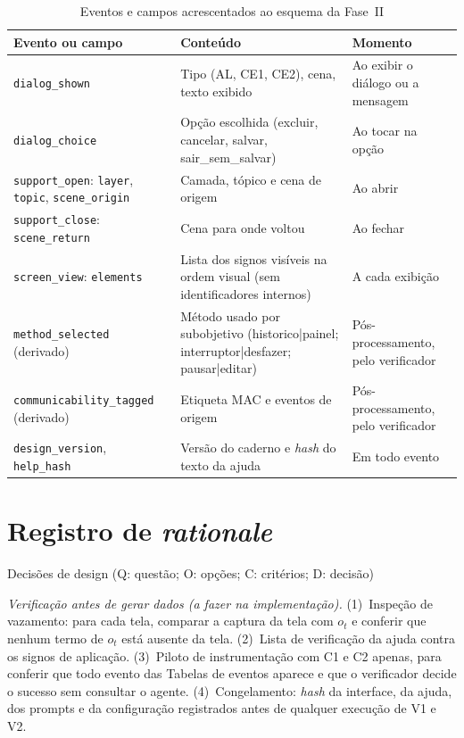 \documentclass[conference,onecolumn]{IEEEtran}
\newcommand{\ev}[1]{\texttt{#1}}
\begin{document}
\begin{table}[!h]
\caption{Eventos e campos acrescentados ao esquema da Fase~II}
\label{tab:eventos}
\centering
\footnotesize
\begin{tabularx}{\textwidth}{@{}P{3.4cm}YP{3.2cm}@{}}
\toprule
\textbf{Evento ou campo} & \textbf{Conteúdo} & \textbf{Momento} \\
\midrule
\ev{dialog\_shown} & Tipo (AL, CE1, CE2), cena, texto exibido & Ao exibir o diálogo ou a mensagem \\
\ev{dialog\_choice} & Opção escolhida (excluir, cancelar, salvar, sair\_sem\_salvar) & Ao tocar na opção \\
\ev{support\_open}: \texttt{layer}, \texttt{topic}, \texttt{scene\_origin} & Camada, tópico e cena de origem & Ao abrir \\
\ev{support\_close}: \texttt{scene\_return} & Cena para onde voltou & Ao fechar \\
\ev{screen\_view}: \texttt{elements} & Lista dos signos visíveis na ordem visual (sem identificadores internos) & A cada exibição \\
\ev{method\_selected} (derivado) & Método usado por subobjetivo (historico|painel; interruptor|desfazer; pausar|editar) & Pós-processamento, pelo verificador \\
\ev{communicability\_tagged} (derivado) & Etiqueta MAC e eventos de origem & Pós-processamento, pelo verificador \\
\texttt{design\_version}, \texttt{help\_hash} & Versão do caderno e \textit{hash} do texto da ajuda & Em todo evento \\
\bottomrule
\end{tabularx}
\end{table}

\section{Registro de \textit{rationale}}\label{sec:rationale}

\begin{table}[!h]
\caption{Decisões de design (Q: questão; O: opções; C: critérios; D: decisão)~\cite{dix2004}}
\label{tab:rationale}
\centering
\scriptsize

\end{table}

\textit{Verificação antes de gerar dados (a fazer na implementação).} (1)~Inspeção de vazamento: para cada tela, comparar a captura da tela com $o_t$ e conferir que nenhum termo de $o_t$ está ausente da tela. (2)~Lista de verificação da ajuda contra os signos de aplicação. (3)~Piloto de instrumentação com C1 e C2 apenas, para conferir que todo evento das Tabelas de eventos aparece e que o verificador decide o sucesso sem consultar o agente. (4)~Congelamento: \textit{hash} da interface, da ajuda, dos prompts e da configuração registrados antes de qualquer execução de V1 e V2.



\end{document}
